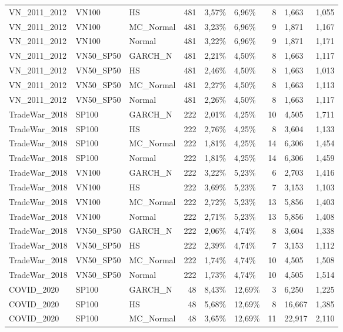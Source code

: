 \begin{longtable}{lllrllrll}
VN\_2011\_2012 & VN100 & HS & 481 & 3,57\% & 6,96\% & 8 & 1,663 & 1,055 \\
VN\_2011\_2012 & VN100 & MC\_Normal & 481 & 3,23\% & 6,96\% & 9 & 1,871 & 1,167 \\
VN\_2011\_2012 & VN100 & Normal & 481 & 3,22\% & 6,96\% & 9 & 1,871 & 1,171 \\
VN\_2011\_2012 & VN50\_SP50 & GARCH\_N & 481 & 2,21\% & 4,50\% & 8 & 1,663 & 1,117 \\
VN\_2011\_2012 & VN50\_SP50 & HS & 481 & 2,46\% & 4,50\% & 8 & 1,663 & 1,013 \\
VN\_2011\_2012 & VN50\_SP50 & MC\_Normal & 481 & 2,27\% & 4,50\% & 8 & 1,663 & 1,113 \\
VN\_2011\_2012 & VN50\_SP50 & Normal & 481 & 2,26\% & 4,50\% & 8 & 1,663 & 1,117 \\
TradeWar\_2018 & SP100 & GARCH\_N & 222 & 2,01\% & 4,25\% & 10 & 4,505 & 1,711 \\
TradeWar\_2018 & SP100 & HS & 222 & 2,76\% & 4,25\% & 8 & 3,604 & 1,133 \\
TradeWar\_2018 & SP100 & MC\_Normal & 222 & 1,81\% & 4,25\% & 14 & 6,306 & 1,454 \\
TradeWar\_2018 & SP100 & Normal & 222 & 1,81\% & 4,25\% & 14 & 6,306 & 1,459 \\
TradeWar\_2018 & VN100 & GARCH\_N & 222 & 3,22\% & 5,23\% & 6 & 2,703 & 1,416 \\
TradeWar\_2018 & VN100 & HS & 222 & 3,69\% & 5,23\% & 7 & 3,153 & 1,103 \\
TradeWar\_2018 & VN100 & MC\_Normal & 222 & 2,72\% & 5,23\% & 13 & 5,856 & 1,403 \\
TradeWar\_2018 & VN100 & Normal & 222 & 2,71\% & 5,23\% & 13 & 5,856 & 1,408 \\
TradeWar\_2018 & VN50\_SP50 & GARCH\_N & 222 & 2,06\% & 4,74\% & 8 & 3,604 & 1,338 \\
TradeWar\_2018 & VN50\_SP50 & HS & 222 & 2,39\% & 4,74\% & 7 & 3,153 & 1,112 \\
TradeWar\_2018 & VN50\_SP50 & MC\_Normal & 222 & 1,74\% & 4,74\% & 10 & 4,505 & 1,508 \\
TradeWar\_2018 & VN50\_SP50 & Normal & 222 & 1,73\% & 4,74\% & 10 & 4,505 & 1,514 \\
COVID\_2020 & SP100 & GARCH\_N & 48 & 8,43\% & 12,69\% & 3 & 6,250 & 1,225 \\
COVID\_2020 & SP100 & HS & 48 & 5,68\% & 12,69\% & 8 & 16,667 & 1,385 \\
COVID\_2020 & SP100 & MC\_Normal & 48 & 3,65\% & 12,69\% & 11 & 22,917 & 2,110 \\

\end{longtable}
